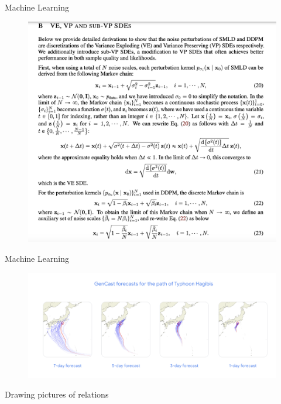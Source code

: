 \documentclass[10pt]{beamer}
\begin{document}
\begin{frame}{Machine Learning}
\footnotesize 
\begin{figure}[ht]
        \centering
        \includegraphics[width=.8\textwidth]{images/gencast_3}
\end{figure}
\end{frame}

\begin{frame}{Machine Learning}
\footnotesize 
\begin{figure}[ht]
        \centering
        \includegraphics[width=\textwidth]{images/gencast_2}
\end{figure}
\end{frame}


\begin{frame}[standout]
Drawing pictures of relations
\end{frame}
\end{document}
